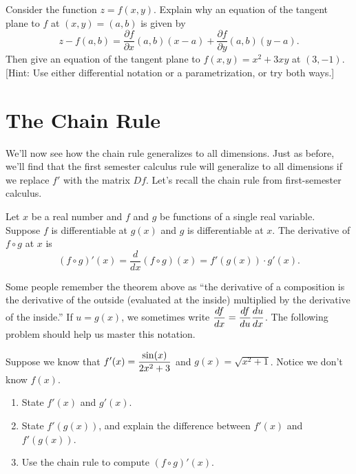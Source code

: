 \begin{problem}
 Consider the function $z=f(x,y)$. Explain why an equation of the tangent plane to $f$ at $(x,y)=(a,b)$ is given by  
$$z-f(a,b) = \frac{\partial f}{\partial x}(a,b) (x-a) +  \frac{\partial f}{\partial y}(a,b) (y-a).$$
Then give an equation of the tangent plane to $f(x,y) = x^2+3xy$ at $(3,-1)$. 
[Hint: Use either differential notation or a parametrization, or try both ways.]
\end{problem}


\section{The Chain Rule}

We'll now see how the chain rule generalizes to all dimensions.  Just as before, we'll find that the first semester calculus rule will generalize to all dimensions if we replace $f'$ with the matrix $Df$. 
Let's recall the chain rule from first-semester calculus. 

\begin{theorem}
 Let $x$ be a real number and $f$ and $g$ be functions of a single real variable. Suppose $f$ is differentiable at $g(x)$ and $g$ is differentiable at $x$. The derivative of $f\circ g$ at $x$ is 
$$(f\circ g)'(x) = \frac{d}{dx}(f\circ g)(x) = f'(g(x))\cdot g'(x).$$
\end{theorem}

Some people remember the theorem above as ``the derivative of a composition is the derivative of the outside (evaluated at the inside) multiplied by the derivative of the inside.'' If $u=g(x)$, we sometimes write $\displaystyle \frac{df}{dx}=\frac{df}{du}\frac{du}{dx}$. The following problem should help us master this notation.

\begin{problem}\label{chain rule review problem}
 Suppose we know that $\displaystyle f'(x) = \frac{\sin(x)}{2x^2+3}$ and $g(x)=\sqrt{x^2+1}$. Notice we don't know $f(x)$. 
\begin{enumerate}
 \item State $f'(x)$ and $g'(x)$.
 \item State $f'(g(x))$, and explain the difference between $f'(x)$ and $f'(g(x))$. 
 \item Use the chain rule to compute $(f\circ g)'(x)$. 
\end{enumerate}
\end{problem}

